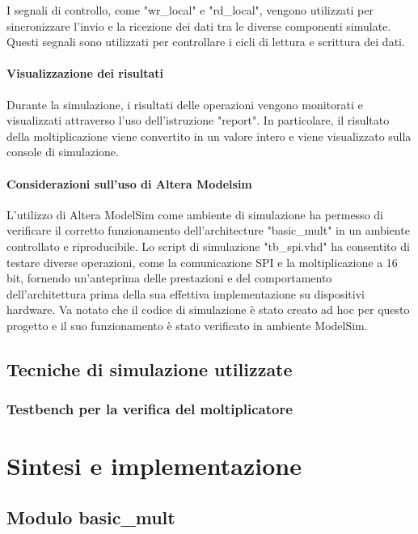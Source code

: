 \documentclass[titlepage]{report}
\begin{document}
				I segnali di controllo, come "wr\_local" e "rd\_local", vengono utilizzati per sincronizzare l'invio e la ricezione dei dati tra le diverse componenti simulate. Questi segnali sono utilizzati per controllare i cicli di lettura e scrittura dei dati.

			\subsubsection{Visualizzazione dei risultati}

				Durante la simulazione, i risultati delle operazioni vengono monitorati e visualizzati attraverso l'uso dell'istruzione "report". In particolare, il risultato della moltiplicazione viene convertito in un valore intero e viene visualizzato sulla console di simulazione.

			\subsubsection{Considerazioni sull'uso di Altera Modelsim}

				L'utilizzo di Altera ModelSim come ambiente di simulazione ha permesso di verificare il corretto funzionamento dell'architecture "basic\_mult" in un ambiente controllato e riproducibile. Lo script di simulazione "tb\_spi.vhd" ha consentito di testare diverse operazioni, come la comunicazione SPI e la moltiplicazione a 16 bit, fornendo un'anteprima delle prestazioni e del comportamento dell'architettura prima della sua effettiva implementazione su dispositivi hardware. Va notato che il codice di simulazione è stato creato ad hoc per questo progetto e il suo funzionamento è stato verificato in ambiente ModelSim.

	\section{Tecniche di simulazione utilizzate}
	\label{sec:tecniche_simulazione}
		\subsection{Testbench per la verifica del moltiplicatore}
		\label{subsec:testbench_verifica}

\chapter*{Sintesi e implementazione}
\label{ch:sintesi_implementazione}

	\section*{Modulo basic\_mult}
	\label{sec:modulo_basic_mult}
\end{document}
